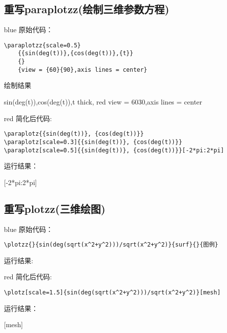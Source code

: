 \documentclass[fontset=windows, 12pt]{article}
\begin{document}
\newpage
\subsection{重写paraplotzz(绘制三维参数方程)}

\begin{formal}{blue}
    原始代码：
\begin{verbatim}
\paraplotzz{scale=0.5} 
    {{sin(deg(t))},{cos(deg(t))},{t}} 
    {}
    {view = {60}{90},axis lines = center}
\end{verbatim}

    \noindent 绘制结果
    \begin{center}
            {{sin(deg(t))},{cos(deg(t))},{t}}
            {thick, red}
            {view = {60}{30},axis lines = center}  
    \end{center}
\end{formal}

\begin{formal}{red}
    简化后代码: 
\begin{verbatim}
\paraplotz{{sin(deg(t))}, {cos(deg(t))}}
\paraplotz[scale=0.3]{{sin(deg(t))}, {cos(deg(t))}}
\paraplotz[scale=0.5]{{sin(deg(t))}, {cos(deg(t))}}[-2*pi:2*pi]
\end{verbatim}

    \noindent 运行结果：
    \begin{center}
        [-2*pi:2*pi]
    \end{center}
\end{formal}

\newpage
\subsection{重写plotzz(三维绘图)}

\begin{formal}{blue}
    原始代码：
\begin{verbatim}
\plotzz{}{sin(deg(sqrt(x^2+y^2)))/sqrt(x^2+y^2)}{surf}{}{图例}
\end{verbatim}

    \noindent 运行结果:
    \begin{center}
    \end{center}
\end{formal}

\begin{formal}{red}
    简化后代码:
\begin{verbatim}
\plotz[scale=1.5]{sin(deg(sqrt(x^2+y^2)))/sqrt(x^2+y^2)}[mesh]   
\end{verbatim}

    \noindent 运行结果：
    \begin{center}
        [mesh]
    \end{center}
\end{formal}
\end{document}
